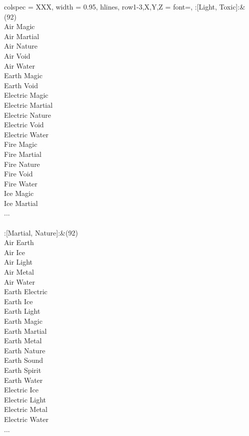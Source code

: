 \begin{longtblr}[
	caption = {2v2 Attacking Effective},
	label = {2v2-Attacking-Effective},
]{
	colspec = {XXX}, width = 0.95\linewidth,
	hlines,
	row{1-3,X,Y,Z} = {font=\bfseries},
}
	:[Light, Toxic]:&{(92)\\
	Air Magic \\
	Air Martial \\
	Air Nature \\
	Air Void \\
	Air Water \\
	Earth Magic \\
	Earth Void \\
	Electric Magic \\
	Electric Martial \\
	Electric Nature \\
	Electric Void \\
	Electric Water \\
	Fire Magic \\
	Fire Martial \\
	Fire Nature \\
	Fire Void \\
	Fire Water \\
	Ice Magic \\
	Ice Martial \\
	...\\
	}\\

	:[Martial, Nature]:&{(92)\\
	Air Earth \\
	Air Ice \\
	Air Light \\
	Air Metal \\
	Air Water \\
	Earth Electric \\
	Earth Ice \\
	Earth Light \\
	Earth Magic \\
	Earth Martial \\
	Earth Metal \\
	Earth Nature \\
	Earth Sound \\
	Earth Spirit \\
	Earth Water \\
	Electric Ice \\
	Electric Light \\
	Electric Metal \\
	Electric Water \\
	...\\
	}\\


\end{longtblr}
